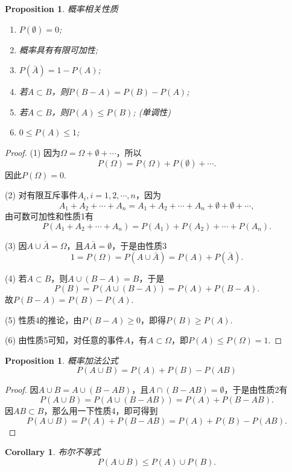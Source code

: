 \documentclass{article}
\newtheorem{corollary}[theorem]{Corollary}
\newtheorem{proposition}[theorem]{Proposition}
\begin{document}
\begin{proposition}
\rm {\color{red}概率相关性质}
\begin{enumerate}
	\item $P(\emptyset) = 0$;
	\item 概率具有有限可加性;
	\item $P(\bar{A}) = 1 - P(A)$;
	\item 若$A \subset B$，则$P(B-A) = P(B) - P(A)$;
	\item 若$A\subset B$，则$P(A) \leq P(B)$; (单调性)
	\item $0 \leq P(A) \leq 1$;
\end{enumerate}
\end{proposition}

\begin{proof}
(1) 因为$\Omega = \Omega + \emptyset + \cdots$，所以
$$
P(\Omega) = P(\Omega) + P(\emptyset) + \cdots.
$$
因此$P(\Omega) = 0$.

(2) 对有限互斥事件$A_i,i=1,2,\cdots,n$，因为
$$
A_1 + A_2 + \cdots + A_n = A_1 + A_2 + \cdots + A_n + \emptyset +\emptyset + \cdots,
$$
由可数可加性和性质1有
$$
P(A_1 + A_2 + \cdots + A_n) = P(A_1) + P(A_2) + \cdots + P(A_n). 
$$

(3)
因$A \cup \bar{A} = \Omega$，且$A\bar{A} = \emptyset$，于是由性质3
$$
1 = P(\Omega) = P(A \cup \bar{A}) = P(A) + P(\bar{A}).
$$

(4) 若$A \subset B$，则$A \cup (B-A) = B$，于是
$$
P(B) = P(A \cup (B-A)) = P(A) + P(B-A).
$$
故$P(B-A) = P(B) - P(A)$. 

(5) 性质4的推论，由$P(B-A) \geq 0$，即得$P(B) \geq P(A)$. 

(6) 由性质5可知，对任意的事件$A$，有$A \subset \Omega$，即$P(A) \leq P(\Omega) = 1$. 
\end{proof}

\begin{proposition}
\rm 概率加法公式
$$
P(A \cup B) = P(A) + P(B) - P(AB) 
$$
\end{proposition}

\begin{proof}
因$A \cup B = A \cup (B - AB)$，且$A \cap (B-AB) = \emptyset$，于是由性质2有
$$
P(A \cup B) = P(A \cup (B-AB)) = P(A) + P(B-AB).
$$
因$AB \subset B$，那么用一下性质4，即可得到
$$
P(A \cup B) = P(A) + P(B-AB) = P(A) + P(B) - P(AB).
$$
\end{proof}

\begin{corollary}
\rm 布尔不等式
$$
P(A \cup B) \leq P(A) \cup P(B).
$$
\end{corollary}
\end{document}
